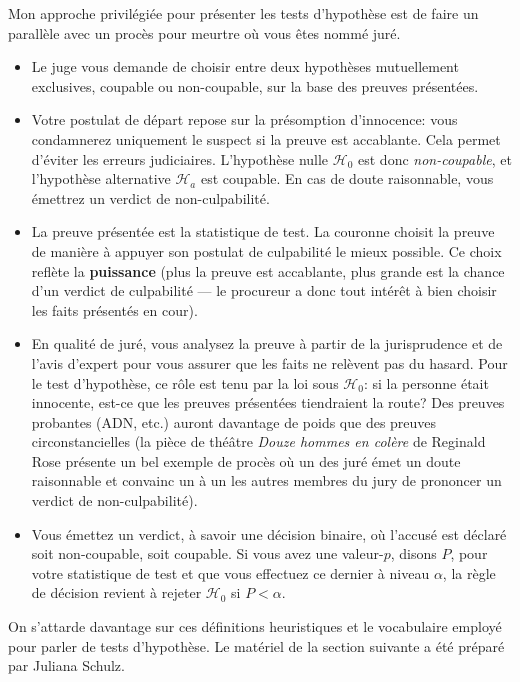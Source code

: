 \documentclass[
  11pt,
  letterpaper,
]{book}
\providecommand{\tightlist}{%
  \setlength{\itemsep}{0pt}\setlength{\parskip}{0pt}}
\begin{document}
Mon approche privilégiée pour présenter les tests d'hypothèse est de faire un parallèle avec un procès pour meurtre où vous êtes nommé juré.

\begin{itemize}
\tightlist
\item
  Le juge vous demande de choisir entre deux hypothèses mutuellement exclusives, coupable ou non-coupable, sur la base des preuves présentées.
\item
  Votre postulat de départ repose sur la présomption d'innocence: vous condamnerez uniquement le suspect si la preuve est accablante. Cela permet d'éviter les erreurs judiciaires. L'hypothèse nulle \(\mathscr{H}_0\) est donc \emph{non-coupable}, et l'hypothèse alternative \(\mathscr{H}_a\) est coupable. En cas de doute raisonnable, vous émettrez un verdict de non-culpabilité.
\item
  La preuve présentée est la statistique de test. La couronne choisit la preuve de manière à appuyer son postulat de culpabilité le mieux possible. Ce choix reflète la \textbf{puissance} (plus la preuve est accablante, plus grande est la chance d'un verdict de culpabilité --- le procureur a donc tout intérêt à bien choisir les faits présentés en cour).
\item
  En qualité de juré, vous analysez la preuve à partir de la jurisprudence et de l'avis d'expert pour vous assurer que les faits ne relèvent pas du hasard. Pour le test d'hypothèse, ce rôle est tenu par la loi sous \(\mathscr{H}_0\): si la personne était innocente, est-ce que les preuves présentées tiendraient la route? Des preuves probantes (ADN, etc.) auront davantage de poids que des preuves circonstancielles (la pièce de théâtre \emph{Douze hommes en colère} de Reginald Rose présente un bel exemple de procès où un des juré émet un doute raisonnable et convainc un à un les autres membres du jury de prononcer un verdict de non-culpabilité).
\item
  Vous émettez un verdict, à savoir une décision binaire, où l'accusé est déclaré soit non-coupable, soit coupable. Si vous avez une valeur-\(p\), disons \(P\), pour votre statistique de test et que vous effectuez ce dernier à niveau \(\alpha\), la règle de décision revient à rejeter \(\mathscr{H}_0\) si \(P < \alpha\).
\end{itemize}

On s'attarde davantage sur ces définitions heuristiques et le vocabulaire employé pour parler de tests d'hypothèse. Le matériel de la section suivante a été préparé par Juliana Schulz.
\end{document}
